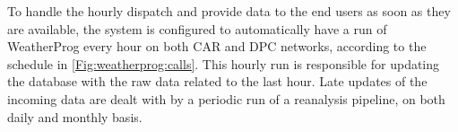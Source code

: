 \documentclass[authoryear,preprint,review,12pt]{elsarticle}
\newcommand{\review}[1]{\emph{\textcolor{cyan}{#1}}}
\begin{document}
 
 
To handle the hourly dispatch and provide data to the end users as soon as they are available, the system is configured to automatically have a run of WeatherProg every hour on both CAR and DPC networks, according to the schedule in \cref{Fig:weatherprog:calls}.
This hourly run is responsible for updating the database with the raw data related to the last hour.
Late updates of the incoming data are dealt with by a periodic run of a reanalysis pipeline, on both daily and monthly basis.


\end{document}
